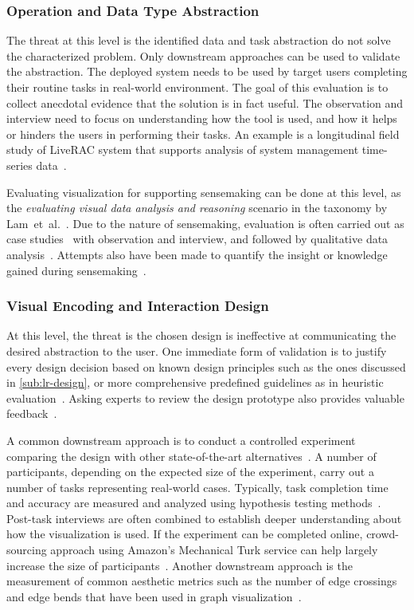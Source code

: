 \subsubsection{Operation and Data Type Abstraction}
The threat at this level is the identified data and task abstraction do not solve the characterized problem. Only downstream approaches can be used to validate the abstraction. The deployed system needs to be used by target users completing their routine tasks in real-world environment. The goal of this evaluation is to collect anecdotal evidence that the solution is in fact useful. The observation and interview need to focus on understanding how the tool is used, and how it helps or hinders the users in performing their tasks. An example is a longitudinal field study of LiveRAC system that supports analysis of system management time-series data~\cite{McLachlan2008}.

Evaluating visualization for supporting sensemaking can be done at this level, as the \emph{evaluating visual data analysis and reasoning} scenario in the taxonomy by Lam~et~al.~\cite{Lam2012}. Due to the nature of sensemaking, evaluation is often carried out as case studies~\cite{Kang2011} with observation and interview, and followed by qualitative data analysis~\cite{Lazar2010}. Attempts also have been made to quantify the insight or knowledge gained during sensemaking~\cite{Wilson2013}.

\subsubsection{Visual Encoding and Interaction Design}
At this level, the threat is the chosen design is ineffective at communicating the desired abstraction to the user. One immediate form of validation is to justify every design decision based on known design principles such as the ones discussed in \autoref{sub:lr-design}, or more comprehensive predefined guidelines as in heuristic evaluation~\cite{Zuk2006}. Asking experts to review the design prototype also provides valuable feedback~\cite{Tory2005}.

A common downstream approach is to conduct a controlled experiment comparing the design with other state-of-the-art alternatives~\cite{Xu2012}. A number of participants, depending on the  expected size of the experiment, carry out a number of tasks representing real-world cases. Typically, task completion time and accuracy are measured and analyzed using hypothesis testing methods~\cite{Field2003}. Post-task interviews are often combined to establish deeper understanding about how the visualization is used. If the experiment can be completed online, crowd-sourcing approach using Amazon's Mechanical Turk service can help largely increase the size of participants~\cite{Heer2010a}. Another downstream approach is the measurement of common aesthetic metrics such as the number of edge crossings and edge bends that have been used in graph visualization~\cite{Sugiyama1981}.


